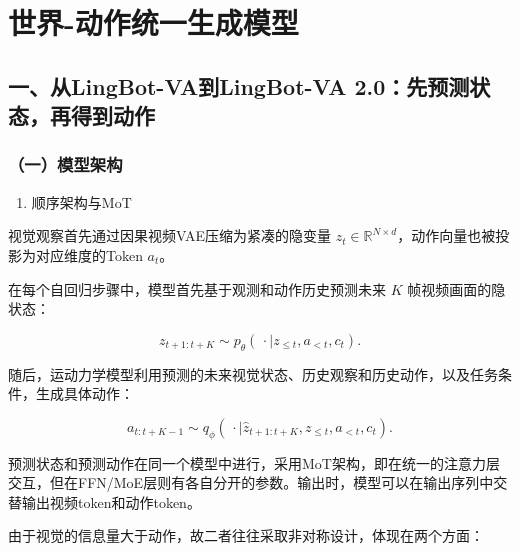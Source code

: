 \setcounter{section}{1}

\hypertarget{ux4e16ux754c-ux52a8ux4f5cux7edfux4e00ux751fux6210ux6a21ux578b}{%
\section{世界-动作统一生成模型}\label{ux4e16ux754c-ux52a8ux4f5cux7edfux4e00ux751fux6210ux6a21ux578b}}

\hypertarget{ux4e00ux4ecelingbot-vaux5230lingbot-va-2.0ux5148ux9884ux6d4bux72b6ux6001ux518dux5f97ux5230ux52a8ux4f5c}{%
\subsection{一、从LingBot-VA到LingBot-VA 2.0：先预测状态，再得到动作}\label{ux4e00ux4ecelingbot-vaux5230lingbot-va-2.0ux5148ux9884ux6d4bux72b6ux6001ux518dux5f97ux5230ux52a8ux4f5c}}

\hypertarget{ux4e00ux6a21ux578bux67b6ux6784-1}{%
\subsubsection{（一）模型架构}\label{ux4e00ux6a21ux578bux67b6ux6784-1}}

\begin{enumerate}
\def\labelenumi{\arabic{enumi}.}
\tightlist
\item
  顺序架构与MoT
\end{enumerate}

视觉观察首先通过因果视频VAE压缩为紧凑的隐变量 \(z_t\in\mathbb{R}^{N\times d}\)，动作向量也被投影为对应维度的Token \(a_t\)。

在每个自回归步骤中，模型首先基于观测和动作历史预测未来 \(K\) 帧视频画面的隐状态：

\[
z_{t+1:t+K}\sim p_\theta\!\left(\,\cdot\mid z_{\leq t},a_{\lt t},c_t\right).
\]

随后，运动力学模型利用预测的未来视觉状态、历史观察和历史动作，以及任务条件，生成具体动作：

\[
a_{t:t+K-1}\sim q_\phi\!\left(\,\cdot\mid\hat{z}_{t+1:t+K},z_{\leq t},a_{\lt t},c_t\right).
\]

预测状态和预测动作在同一个模型中进行，采用MoT架构，即在统一的注意力层交互，但在FFN/MoE层则有各自分开的参数。输出时，模型可以在输出序列中交替输出视频token和动作token。

由于视觉的信息量大于动作，故二者往往采取非对称设计，体现在两个方面：

